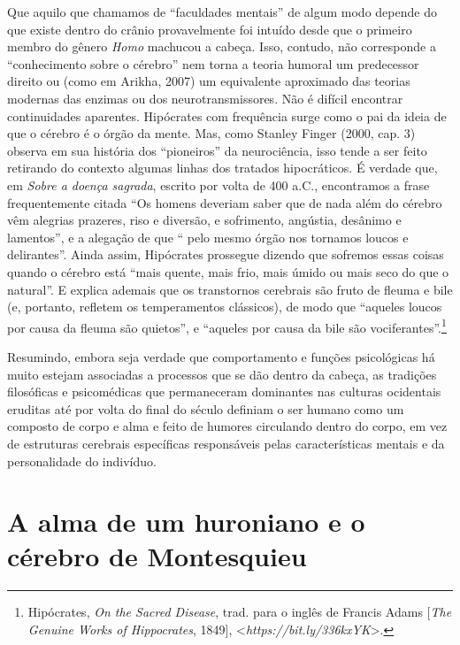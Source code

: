 Que aquilo que chamamos de ``faculdades mentais'' de algum modo depende
do que existe dentro do crânio provavelmente foi intuído desde que o
primeiro membro do gênero \emph{Homo} machucou a cabeça. Isso, contudo,
não corresponde a ``conhecimento sobre o cérebro'' nem torna a teoria
humoral um predecessor direito ou (como em Arikha, 2007) um equivalente
aproximado das teorias modernas das enzimas ou dos neurotransmissores.
Não é difícil encontrar continuidades aparentes. Hipócrates com
frequência surge como o pai da ideia de que o cérebro é o órgão da
mente. Mas, como Stanley Finger (2000, cap. 3) observa em sua história
dos ``pioneiros'' da neurociência, isso tende a ser feito retirando do
contexto algumas linhas dos tratados hipocráticos. É verdade que, em \emph{Sobre a
doença sagrada}, escrito por volta de 400 a.C., encontramos a
frase frequentemente citada ``Os homens deveriam saber que de nada além
do cérebro vêm alegrias prazeres, riso e diversão, e sofrimento,
angústia, desânimo e lamentos'', e a alegação de que `` pelo mesmo órgão
nos tornamos loucos e delirantes''. Ainda assim, Hipócrates prossegue
dizendo que sofremos essas coisas quando o cérebro está ``mais quente,
mais frio, mais úmido ou mais seco do que o natural''. E explica ademais
que os transtornos cerebrais são fruto de fleuma e bile (e, portanto,
refletem os temperamentos clássicos), de modo que ``aqueles loucos por causa da
fleuma são quietos'', e ``aqueles por causa da bile são
vociferantes''.\footnote[8]{Hipócrates, \emph{On the Sacred Disease}, trad. para o inglês de
Francis Adams {[}\emph{The Genuine Works of Hippocrates}, 1849{]},
\textless{}\emph{https://bit.ly/336kxYK}\textgreater{}.}

Resumindo, embora seja verdade que comportamento e funções psicológicas
há muito estejam associadas a processos que se dão dentro da cabeça, as
tradições filosóficas e psicomédicas que permaneceram dominantes nas
culturas ocidentais eruditas até por volta do final do século 
definiam o ser humano como um composto de corpo e alma e feito de
humores circulando dentro do corpo, em vez de estruturas cerebrais
específicas responsáveis pelas características mentais e da personalidade do
indivíduo.

\section{A alma de um huroniano e o cérebro de Montesquieu}

